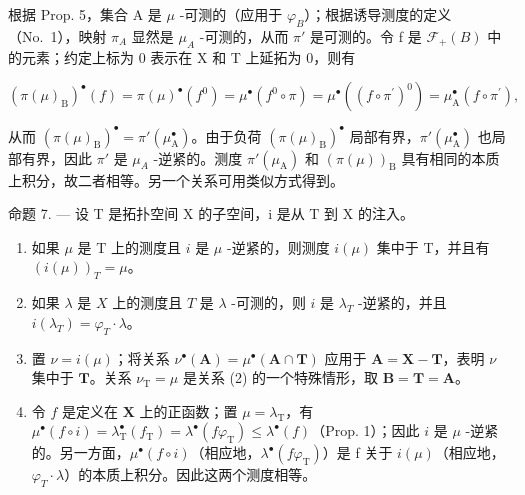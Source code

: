 根据 Prop. 5，集合 A 是 \(\mu\) -可测的（应用于 \(\varphi_{B}\)）；根据诱导测度的定义（No.~1），映射 \(\pi_{A}\) 显然是 \(\mu_{A}\) -可测的，从而 \(\pi'\) 是可测的。令 f 是 \(\mathcal{F}_{+}(B)\) 中的元素；约定上标为 0 表示在 X 和 T 上延拓为 0，则有

\[
\left(\pi (\mu) _ {\mathrm{B}}\right) ^ {\bullet} (f) = \pi (\mu) ^ {\bullet} \left(f ^ {0}\right) = \mu^ {\bullet} \left(f ^ {0} \circ \pi\right) = \mu^ {\bullet} \left(\left(f \circ \pi^ {\prime}\right) ^ {0}\right) = \mu_ {\mathrm{A}} ^ {\bullet} \left(f \circ \pi^ {\prime}\right),
\]

从而 \(\left(\pi(\mu)_{\mathrm{B}}\right)^{\bullet} = \pi'(\mu_{\mathrm{A}}^{\bullet})\)。由于负荷 \(\left(\pi(\mu)_{\mathrm{B}}\right)^{\bullet}\) 局部有界，\(\pi'(\mu_{\mathrm{A}}^{\bullet})\) 也局部有界，因此 \(\pi'\) 是 \(\mu_{A}\) -逆紧的。测度 \(\pi'(\mu_{\mathrm{A}})\) 和 \(\left(\pi(\mu)\right)_{\mathrm{B}}\) 具有相同的本质上积分，故二者相等。另一个关系可用类似方式得到。

命题 7. --- 设 T 是拓扑空间 X 的子空间，i 是从 T 到 X 的注入。

\begin{enumerate}
\def\labelenumi{\alph{enumi})}
\item
  如果 \(\mu\) 是 T 上的测度且 \(i\) 是 \(\mu\) -逆紧的，则测度 \(i(\mu)\) 集中于 T，并且有 \((i(\mu))_{T} = \mu\)。
\item
  如果 \(\lambda\) 是 \(X\) 上的测度且 \(T\) 是 \(\lambda\) -可测的，则 \(i\) 是 \(\lambda_{T}\) -逆紧的，并且 \(i(\lambda_T) = \varphi_T \cdot \lambda\)。
\item
  置 \(\nu = i(\mu)\)；将关系 \(\nu^{\bullet}(\mathbf{A}) = \mu^{\bullet}(\mathbf{A} \cap \mathbf{T})\) 应用于 \(\mathbf{A} = \mathbf{X} - \mathbf{T}\)，表明 \(\nu\) 集中于 \(\mathbf{T}\)。关系 \(\nu_{\mathrm{T}} = \mu\) 是关系 (2) 的一个特殊情形，取 \(\mathbf{B} = \mathbf{T} = \mathbf{A}\)。
\item
  令 \(f\) 是定义在 \(\mathbf{X}\) 上的正函数；置 \(\mu = \lambda_{\mathrm{T}}\)，有 \(\mu^{\bullet}(f \circ i) = \lambda_{\mathrm{T}}^{\bullet}(f_{\mathrm{T}}) = \lambda^{\bullet}(f\varphi_{\mathrm{T}}) \leqslant \lambda^{\bullet}(f)\)（Prop. 1）；因此 \(i\) 是 \(\mu\) -逆紧的。另一方面，\(\mu^{\bullet}(f \circ i)\)（相应地，\(\lambda^{\bullet}(f\varphi_{\mathrm{T}})\)）是 f 关于 \(i(\mu)\)（相应地，\(\varphi_{T} \cdot \lambda\)）的本质上积分。因此这两个测度相等。
\end{enumerate}


